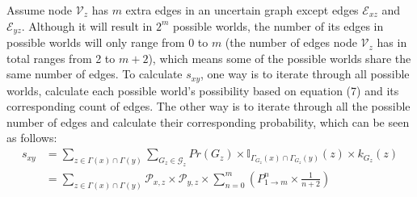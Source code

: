 \documentclass[\main/thesis.tex]{subfiles}
\begin{document}
Assume node $\mathcal{V}_z$ has $m$ extra edges in an uncertain graph except edges $\mathcal{E}_{xz}$ and $\mathcal{E}_{yz}$. Although it will result in $2^m$ possible worlds, the number of its edges in possible worlds will only range from 0 to $m$ (the number of edges node $\mathcal{V}_z$ has in total ranges from 2 to $m+2$), which means some of the possible worlds share the same number of edges. To calculate $s_{xy}$, one way is to iterate through all possible worlds, calculate each possible world's possibility based on equation (7) and its corresponding count of edges. The other way is to iterate through all the possible number of edges and calculate their corresponding probability, which can be seen as follows:
\begin{align*}
s_{xy}&=\sum_{z\in \Gamma(x)\cap\Gamma(y)}\sum_{{G_z}\in \mathcal{G}_z}Pr({G_z})\times\mathbb{I}_{\Gamma_{G_z}(x)\cap\Gamma_{G_z}(y)}(z)\times k_{G_z}(z)\\
&=\sum_{z\in \Gamma(x)\cap\Gamma(y)}\mathcal{P}_{x,z}\times\mathcal{P}_{y,z} \times \sum_{n=0}^{m}(P_{1\rightarrow m}^n \times \frac{1}{n+2})
\end{align*}


\end{document}

